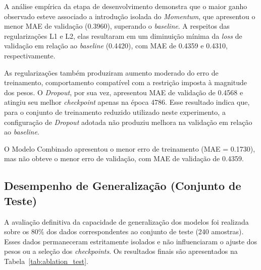 \documentclass[11pt,a4paper]{article}
\begin{document}
A análise empírica da etapa de desenvolvimento demonstra que o maior ganho observado esteve associado a introdução isolada do \textit{Momentum}, que apresentou o menor MAE de validação (0.3960), superando o \textit{baseline}. A respeitos das regularizações L1 e L2, elas resultaram em um diminuição mínima da \textit{loss} de validação em relação ao \textit{baseline} (0.4420), com MAE de 0.4359 e 0.4310, respectivamente.

As regularizações também produziram aumento moderado do erro de treinamento, comportamento compatível com a restrição imposta à magnitude dos pesos. O \textit{Dropout}, por sua vez, apresentou MAE de validação de 0.4568 e atingiu seu melhor \textit{checkpoint} apenas na época 4786. Esse resultado indica que, para o conjunto de treinamento reduzido utilizado neste experimento, a configuração de \textit{Dropout} adotada não produziu melhora na validação em relação ao \textit{baseline}.

O Modelo Combinado apresentou o menor erro de treinamento (MAE = 0.1730), mas não obteve o menor erro de validação, com MAE de validação de 0.4359.

\subsection{Desempenho de Generalização (Conjunto de Teste)}

A avaliação definitiva da capacidade de generalização dos modelos foi realizada sobre os 80\% dos dados correspondentes ao conjunto de teste (240 amostras). Esses dados permaneceram estritamente isolados e não influenciaram o ajuste dos pesos ou a seleção dos \textit{checkpoints}. Os resultados finais são apresentados na Tabela~\ref{tab:ablation_test}.
\end{document}
